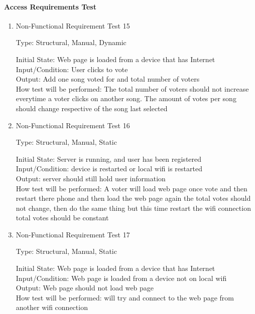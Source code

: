 \documentclass[12pt, titlepage]{article}
\begin{document}
\paragraph{Access Requirements Test}

\begin{enumerate}


\item{Non-Functional Requirement Test 15\\}

Type: Structural, Manual, Dynamic
					
Initial State: Web page is loaded from a device that has Internet \\
					
Input/Condition: User clicks to vote \\
					
Output: Add one song voted for and total number of voters \\
					
How test will be performed: The total number of voters should not increase everytime a voter clicks
on another song. The amount of votes per song should change respective of the song last selected\\


\item{Non-Functional Requirement Test 16\\}

Type: Structural, Manual, Static
					
Initial State: Server is running, and user has been registered \\
					
Input/Condition: device is restarted or local wifi is restarted \\
					
Output: server should still hold user information \\
					
How test will be performed: A voter will load web page once vote and then restart there phone
and then load the web page again the total votes should not change, then do the same thing
but this time restart the wifi connection total votes should be constant \\
\item{Non-Functional Requirement Test 17\\}

Type: Structural, Manual, Static
					
Initial State: Web page is loaded from a device that has Internet \\
					
Input/Condition: Web page is loaded from a device not on local wifi \\
					
Output: Web page should not load web page \\
					
How test will be performed: will try and connect to the web page from another wifi connection \\
\end{enumerate}
\end{document}
